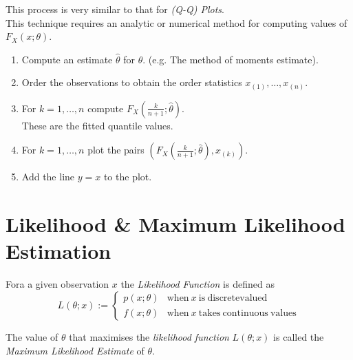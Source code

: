 \documentclass[11pt,a4paper]{article}
\begin{document}
This process is very similar to that for \textit{(Q-Q) Plots}.\\
This technique requires an analytic or numerical method for computing values of $F_X(x;\theta)$.
\begin{enumerate}[label=\roman*)]
	\item Compute an estimate $\hat{\theta}$ for $\theta$. (e.g. The method of moments estimate).
	\item Order the observations to obtain the order statistics $x_{(1)},\dots,x_{(n)}$.
	\item For $k=1,\dots,n$ compute $F_X\left(\frac{k}{n+1};\hat{\theta}\right)$.\\
	\nb	These are the fitted quantile values.
	\item For $k=1,\dots,n$ plot the pairs $\left(F_X\left(\frac{k}{n+1};\hat{\theta}\right),x_{(k)}\right)$.
	\item Add the line $y=x$ to the plot.
\end{enumerate}


\section{Likelihood \& Maximum Likelihood Estimation}

Fora a given observation $x$ the \textit{Likelihood Function} is defined as
$$L(\theta;x):=\begin{cases}p(x;\theta)&\mathrm{when\ }x\mathrm{\ is\ discrete valued}\\f(x;\theta)&\mathrm{when\ }x\mathrm{\ takes\ continuous\ values}\end{cases}$$

The value of $\theta$ that maximises the \textit{likelihood function} $L(\theta;x)$ is called the \textit{Maximum Likelihood Estimate} of $\theta$.\\
\end{document}
